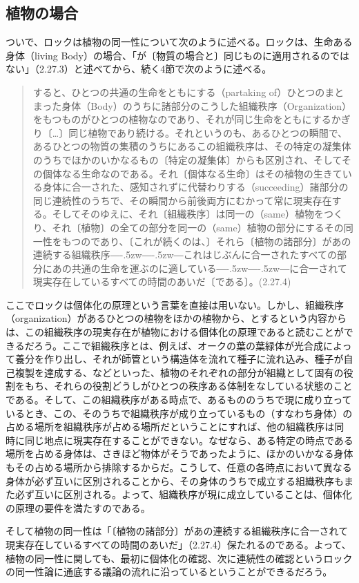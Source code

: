 \documentclass[a4j,oneside]{jsbook}
\def\――{―\kern-.5zw―\kern-.5zw―}
\begin{document}
\subsection*{
植物の場合
}
ついで、ロックは植物の同一性について次のように述べる。ロックは、生命ある身体（living Body）の場合、「が〔物質の場合と〕同じものに適用されるのではない」（2.27.3）と述べてから、続く4節で次のように述べる。
\begin{quote}
すると、ひとつの共通の生命をともにする（partaking of）ひとつのまとまった身体（Body）のうちに諸部分のこうした組織秩序（Organization）をもつものがひとつの植物なのであり、それが同じ生命をともにするかぎり〔…〕同じ植物であり続ける。それというのも、あるひとつの瞬間で、あるひとつの物質の集積のうちにあるこの組織秩序は、その特定の凝集体のうちでほかのいかなるもの〔特定の凝集体〕からも区別され、そしてその個体なる生命なのである。それ〔個体なる生命〕はその植物の生きている身体に合一された、感知されずに代替わりする（succeeding）諸部分の同じ連続性のうちで、その瞬間から前後両方にむかって常に現実存在する。そしてそのゆえに、それ〔組織秩序〕は同一の（same）植物をつくり、それ〔植物〕の全ての部分を同一の（same）植物の部分にするその同一性をもつのであり、〔これが続くのは、〕それら〔植物の諸部分〕があの連続する組織秩序\――これはじぶんに合一されたすべての部分にあの共通の生命を運ぶのに適している\――に合一されて現実存在しているすべての時間のあいだ〔である〕。(2.27.4)
\end{quote}
ここでロックは個体化の原理という言葉を直接は用いない。しかし、組織秩序（organization）があるひとつの植物をほかの植物から、とするという内容からは、この組織秩序の現実存在が植物における個体化の原理であると読むことができるだろう。ここで組織秩序とは、例えば、オークの葉の葉緑体が光合成によって養分を作り出し、それが師管という構造体を流れて種子に流れ込み、種子が自己複製を達成する、などといった、植物のそれぞれの部分が組織として固有の役割をもち、それらの役割どうしがひとつの秩序ある体制をなしている状態のことである。そして、この組織秩序がある時点で、あるもののうちで現に成り立っているとき、この、そのうちで組織秩序が成り立っているもの（すなわち身体）の占める場所を組織秩序が占める場所だということにすれば、他の組織秩序は同時に同じ地点に現実存在することができない。なぜなら、ある特定の時点である場所を占める身体は、さきほど物体がそうであったように、ほかのいかなる身体もその占める場所から排除するからだ。こうして、任意の各時点において異なる身体が必ず互いに区別されることから、その身体のうちで成立する組織秩序もまた必ず互いに区別される。よって、組織秩序が現に成立していることは、個体化の原理の要件を満たすのである。
\par
そして植物の同一性は「〔植物の諸部分〕があの連続する組織秩序に合一されて現実存在しているすべての時間のあいだ」（2.27.4）保たれるのである。よって、植物の同一性に関しても、最初に個体化の確認、次に連続性の確認というロックの同一性論に通底する議論の流れに沿っているということができるだろう。
\end{document}

